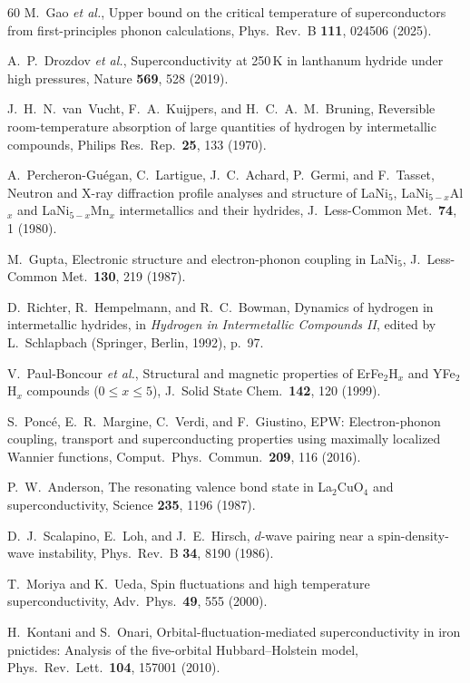 \documentclass[prb,twocolumn,superscriptaddress,longbibliography,floatfix]{revtex4-2}
\begin{document}
\begin{thebibliography}{60}
M.~Gao \textit{et al.},
Upper bound on the critical temperature of superconductors from
first-principles phonon calculations,
Phys.\ Rev.\ B \textbf{111}, 024506 (2025).

A.~P.~Drozdov \textit{et al.},
Superconductivity at 250\,K in lanthanum hydride under high pressures,
Nature \textbf{569}, 528 (2019).

J.~H.~N.~van~Vucht, F.~A.~Kuijpers, and H.~C.~A.~M.~Bruning,
Reversible room-temperature absorption of large quantities of hydrogen by
intermetallic compounds,
Philips Res.\ Rep.\ \textbf{25}, 133 (1970).

A.~Percheron-Gu\'egan, C.~Lartigue, J.~C.~Achard, P.~Germi, and F.~Tasset,
Neutron and X-ray diffraction profile analyses and structure of LaNi$_5$,
LaNi$_{5-x}$Al$_x$ and LaNi$_{5-x}$Mn$_x$ intermetallics and their hydrides,
J.\ Less-Common Met.\ \textbf{74}, 1 (1980).

M.~Gupta,
Electronic structure and electron-phonon coupling in LaNi$_5$,
J.\ Less-Common Met.\ \textbf{130}, 219 (1987).

D.~Richter, R.~Hempelmann, and R.~C.~Bowman,
Dynamics of hydrogen in intermetallic hydrides,
in \textit{Hydrogen in Intermetallic Compounds II},
edited by L.~Schlapbach (Springer, Berlin, 1992), p.~97.

V.~Paul-Boncour \textit{et al.},
Structural and magnetic properties of ErFe$_2$H$_x$ and YFe$_2$H$_x$ compounds
($0 \leq x \leq 5$),
J.\ Solid State Chem.\ \textbf{142}, 120 (1999).

S.~Ponc\'e, E.~R.~Margine, C.~Verdi, and F.~Giustino,
EPW: Electron-phonon coupling, transport and superconducting properties
using maximally localized Wannier functions,
Comput.\ Phys.\ Commun.\ \textbf{209}, 116 (2016).

P.~W.~Anderson,
The resonating valence bond state in La$_2$CuO$_4$ and superconductivity,
Science \textbf{235}, 1196 (1987).

D.~J.~Scalapino, E.~Loh, and J.~E.~Hirsch,
$d$-wave pairing near a spin-density-wave instability,
Phys.\ Rev.\ B \textbf{34}, 8190 (1986).

T.~Moriya and K.~Ueda,
Spin fluctuations and high temperature superconductivity,
Adv.\ Phys.\ \textbf{49}, 555 (2000).

H.~Kontani and S.~Onari,
Orbital-fluctuation-mediated superconductivity in iron pnictides:
Analysis of the five-orbital Hubbard--Holstein model,
Phys.\ Rev.\ Lett.\ \textbf{104}, 157001 (2010).


\end{thebibliography}
\end{document}
